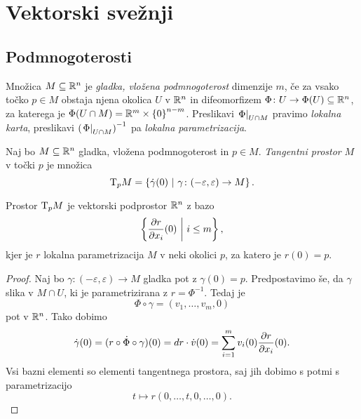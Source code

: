 \section{Vektorski svežnji}

\subsection{Podmnogoterosti}

\begin{definicija}
Množica $M \subseteq \mathbb{R}^n$ je
\emph{gladka, vložena podmnogoterost}
dimenzije $m$, če za vsako točko $p \in M$ obstaja njena okolica
$U$ v $\mathbb{R}^n$ in difeomorfizem
$\Phi \colon U \to \Phi(U) \subseteq \mathbb{R}^n$, za katerega je
$\Phi(U \cap M) = \mathbb{R}^m \times \left\{0\right\}^{n-m}$. Preslikavi
$\left. \Phi\right|_{U \cap M}^{}$ pravimo
\emph{lokalna karta}, preslikavi
$\left(\left. \Phi\right|_{U \cap M}^{}\right)^{-1}$ pa
\emph{lokalna parametrizacija}.
\end{definicija}

\begin{definicija}
Naj bo $M \subseteq \mathbb{R}^n$ gladka, vložena podmnogoterost in
$p \in M$. \emph{Tangentni prostor} $M$ v
točki $p$ je množica
\[
\operatorname{T}\!_p M =
\left\{\dot{\gamma}(0)~\middle\vert~\gamma \colon (-\varepsilon, \varepsilon) \to M\right\}.
\]
\end{definicija}

\begin{trditev}
Prostor $\operatorname{T}\!_p M$ je vektorski podprostor $\mathbb{R}^n$ z bazo
\[
\left\{\frac{\partial r}{\partial x_i}(0)~\middle\vert~i \leq m\right\},
\]
kjer je $r$ lokalna parametrizacija $M$ v neki okolici $p$, za
katero je $r(0) = p$.
\end{trditev}

\begin{proof}
Naj bo $\gamma \colon (-\varepsilon, \varepsilon) \to M$ gladka pot
z $\gamma(0) = p$. Predpostavimo še, da $\gamma$ slika v
$M \cap U$, ki je parametrizirana z $r = \Phi^{-1}$. Tedaj je
\[
\Phi \circ \gamma = (v_1, \dots, v_m, 0)
\]
pot v $\mathbb{R}^n$. Tako dobimo
\[
\dot{\gamma}(0) =
\dot{\left(r \circ \Phi \circ \gamma\right)}(0) =
dr \cdot \dot{v}(0) =
\sum_{i=1}^m v_i(0) \frac{\partial r}{\partial x_i}(0).
\]
Vsi bazni elementi so elementi tangentnega prostora, saj jih dobimo
s potmi s parametrizacijo
\[
t \mapsto r(0, \dots, t, 0, \dots, 0).
\]
\end{proof}
